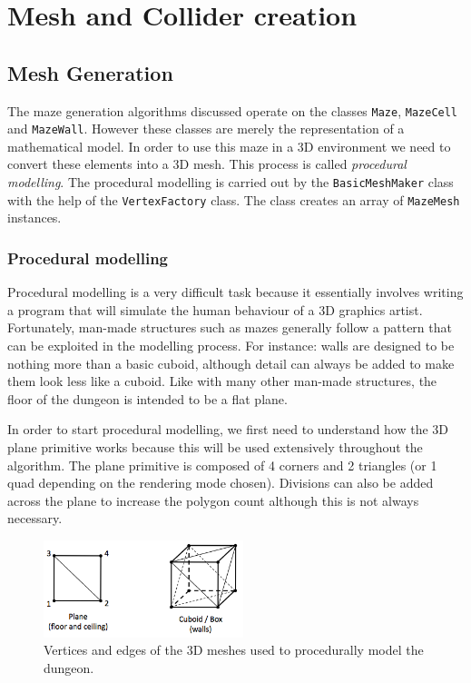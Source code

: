 \chapter{Mesh and Collider creation}

\section{Mesh Generation}
The maze generation algorithms discussed operate on the classes \texttt{Maze}, \texttt{MazeCell} and \texttt{MazeWall}. However these classes are merely the representation of a mathematical model. In order to use this maze in a 3D environment we need to convert these elements into a 3D mesh. This process is called {\em procedural modelling}. The procedural modelling is carried out by the \texttt{BasicMeshMaker} class with the help of the \texttt{VertexFactory} class. The class creates an array of \texttt{MazeMesh} instances.

\subsection{Procedural modelling}
Procedural modelling is a very difficult task because it essentially involves writing a program that will simulate the human behaviour of a 3D graphics artist. Fortunately, man-made structures such as mazes generally follow a pattern that can be exploited in the modelling process. For instance: walls are designed to be nothing more than a basic cuboid, although detail can always be added to make them look less like a cuboid. Like with many other man-made structures, the floor of the dungeon is intended to be a flat plane.

In order to start procedural modelling, we first need to understand how the 3D plane primitive works because this will be used extensively throughout the algorithm. The plane primitive is composed of 4 corners and 2 triangles (or 1 quad depending on the rendering mode chosen). Divisions can also be added across the plane to increase the polygon count although this is not always necessary.

\begin{figure}[h!]
\centering
 \includegraphics[width=0.52\textwidth]{images/what_is_a_plane.png}
\caption{Vertices and edges of the 3D meshes used to procedurally model the dungeon.}
\end{figure}

